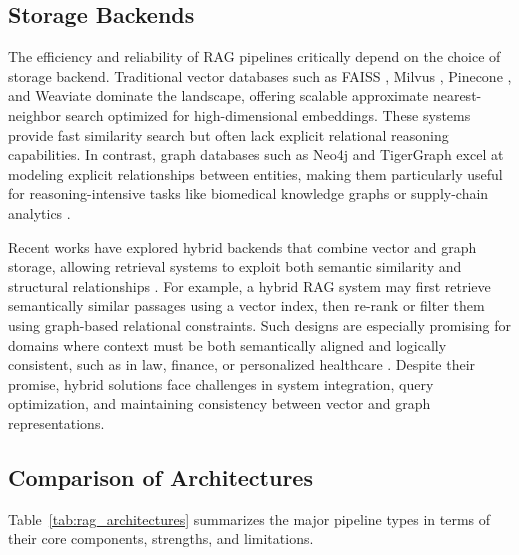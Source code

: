\documentclass[conference]{IEEEtran}
\begin{document}
\subsection{Storage Backends}

The efficiency and reliability of RAG pipelines critically depend on the choice of storage backend. Traditional vector databases such as FAISS \cite{johnson2019faiss}, Milvus \cite{milvus}, Pinecone \cite{pinecone}, and Weaviate \cite{weaviate} dominate the landscape, offering scalable approximate nearest-neighbor search optimized for high-dimensional embeddings. These systems provide fast similarity search but often lack explicit relational reasoning capabilities. In contrast, graph databases such as Neo4j \cite{neo4j} and TigerGraph \cite{tigergraph} excel at modeling explicit relationships between entities, making them particularly useful for reasoning-intensive tasks like biomedical knowledge graphs or supply-chain analytics \cite{wang2021knowledgegraph}. 

Recent works have explored hybrid backends that combine vector and graph storage, allowing retrieval systems to exploit both semantic similarity and structural relationships \cite{singhal2023hybrid,zhang2023graphrag}. For example, a hybrid RAG system may first retrieve semantically similar passages using a vector index, then re-rank or filter them using graph-based relational constraints. Such designs are especially promising for domains where context must be both semantically aligned and logically consistent, such as in law, finance, or personalized healthcare \cite{yin2022survey,chen2023survey}. Despite their promise, hybrid solutions face challenges in system integration, query optimization, and maintaining consistency between vector and graph representations.

\subsection{Comparison of Architectures}

Table~\ref{tab:rag_architectures} summarizes the major pipeline types in terms of their core components, strengths, and limitations.
\end{document}
